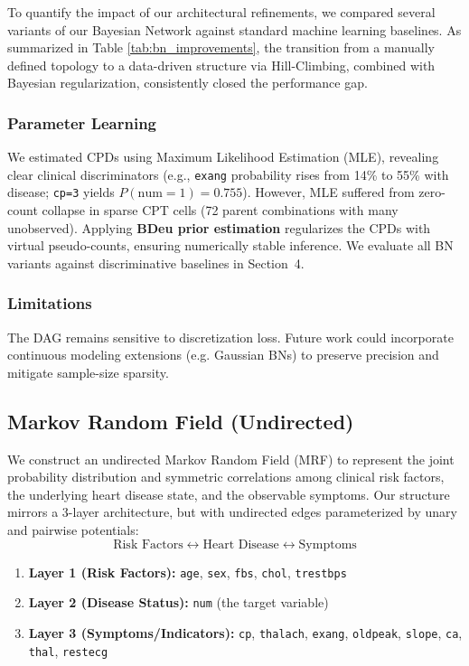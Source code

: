 \documentclass{article}
\begin{document}
To quantify the impact of our architectural refinements, we compared several variants of our Bayesian Network against standard machine learning baselines. As summarized in Table \ref{tab:bn_improvements}, the transition from a manually defined topology to a data-driven structure via Hill-Climbing, combined with Bayesian regularization, consistently closed the performance gap.


\subsubsection{Parameter Learning}
We estimated CPDs using Maximum Likelihood Estimation (MLE), revealing clear clinical discriminators (e.g., \texttt{exang} probability rises from 14\% to 55\% with disease; \texttt{cp=3} yields $P(\text{num}=1)=0.755$). However, MLE suffered from zero-count collapse in sparse CPT cells (72 parent combinations with many unobserved). Applying \textbf{BDeu prior estimation} regularizes the CPDs with virtual pseudo-counts, ensuring numerically stable inference. We evaluate all BN variants against discriminative baselines in Section~4.

\subsubsection{Limitations}
The DAG remains sensitive to discretization loss. Future work could incorporate continuous modeling extensions (e.g. Gaussian BNs) to preserve precision and mitigate sample-size sparsity.

\subsection{Markov Random Field (Undirected)}

We construct an undirected Markov Random Field (MRF) to represent the joint probability distribution and symmetric correlations among clinical risk factors, the underlying heart disease state, and the observable symptoms. Our structure mirrors a 3-layer architecture, but with undirected edges parameterized by unary and pairwise potentials:
\begin{equation}
    \text{Risk Factors} \longleftrightarrow \text{Heart Disease} \longleftrightarrow \text{Symptoms}
\end{equation}

\begin{enumerate}
\item \textbf{Layer 1 (Risk Factors):} \texttt{age}, \texttt{sex}, \texttt{fbs}, \texttt{chol}, \texttt{trestbps}
\item \textbf{Layer 2 (Disease Status):} \texttt{num} (the target variable)
\item \textbf{Layer 3 (Symptoms/Indicators):} \texttt{cp}, \texttt{thalach}, \texttt{exang}, \texttt{oldpeak}, \texttt{slope}, \texttt{ca}, \texttt{thal}, \texttt{restecg}
\end{enumerate}
\end{document}
